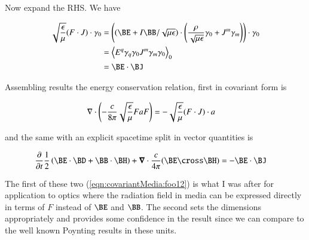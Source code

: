 Now expand the RHS.  We have

\begin{align*}
\sqrt{\frac{\epsilon}{\mu}}
(F \cdot J) \cdot \gamma_0
&=
\left((\BE + I \BB/\sqrt{\mu\epsilon}) \cdot \left( \frac{\rho}{\sqrt{\mu\epsilon}} \gamma_0 + J^m \gamma_m \right) \right) \cdot \gamma_0  \\
&=
\gpgradezero{E^q \gamma_q \gamma_0 J^m \gamma_m \gamma_0} \\
&=
\BE \cdot \BJ
\end{align*}

Assembling results the energy conservation relation, first in covariant form is

\begin{align}\label{eqn:covariantMedia:foo12}
\nabla \cdot \left( -\frac{c}{8 \pi} \sqrt{\frac{\epsilon}{\mu}} F a F \right) &= - \sqrt{\frac{\epsilon}{\mu}}(F \cdot J) \cdot a
\end{align}

and the same with an explicit spacetime split in vector quantities is

\begin{align}\label{eqn:covariantMedia:foo13}
\frac{\partial}{\partial t} \frac{1}{2} \left(\BE \cdot \BD + \BB \cdot \BH \right) + \spacegrad \cdot \frac{c}{4\pi}(\BE \cross \BH)
&=
-\BE \cdot \BJ
\end{align}

The first of these two (\ref{eqn:covariantMedia:foo12}) is what I was after for application to optics where the radiation field in media can be expressed directly in terms of $F$ instead of $\BE$ and $\BB$.  The second sets the dimensions appropriately and provides some confidence in the result since we can compare to the well known Poynting results in these units.

%

\EndArticle

